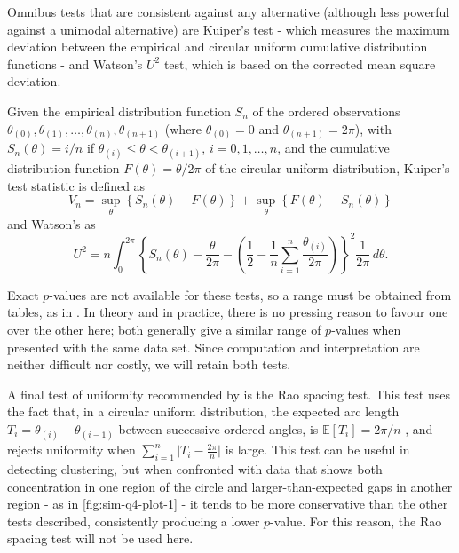 \documentclass[../../ArchStats.tex]{subfiles}
\begin{document}
Omnibus tests that are consistent against any alternative (although less powerful against a unimodal alternative) are Kuiper's test - which measures the maximum deviation between the empirical and circular uniform cumulative distribution functions - and Watson's $U^2$ test, which is based on the corrected mean square deviation. 

Given the empirical distribution function $S_n$ of the ordered observations $\theta_{(0)}, \theta_{(1)}, \dots, \theta_{(n)}, \theta_{(n+1)}$ (where $\theta_{(0)} = 0$ and $\theta_{(n+1)} = 2\pi$), with $S_n(\theta) = i/n$ if $\theta_{(i)} \leq \theta < \theta_{(i+1)}$, $i = 0,1,\dots, n$, and the cumulative distribution function $F(\theta) = \theta/2\pi$ of the circular uniform distribution, Kuiper's test statistic is defined as
\begin{equation}
V_n = \sup_\theta \left\lbrace S_n(\theta) - F(\theta) \right\rbrace + 
\sup_\theta \left\lbrace F(\theta) - S_n(\theta) \right\rbrace 
\end{equation}
and Watson's as
\begin{equation}
U^2 = n \int_0^{2\pi} \left\lbrace S_n(\theta) - \frac{\theta}{2\pi} - \left(\frac{1}{2} - \frac{1}{n} \sum_{i=1}^n \frac{\theta_{(i)}}{2\pi} \right) \right\rbrace^2 \frac{1}{2\pi}\, d\theta.
\end{equation}

Exact $p$-values are not available for these tests, so a range must be obtained from tables, as in \cite{Mardia1999}. In theory and in practice, there is no pressing reason to favour one over the other here; both generally give a similar range of $p$-values when presented with the same data set. Since computation and interpretation are neither difficult nor costly, we will retain both tests.

A final test of uniformity recommended by \cite{Pewsey2014} is the Rao spacing test. This test uses the fact that, in a circular uniform distribution, the expected arc length $T_i = \theta_{(i)} - \theta_{(i-1)}$ between successive ordered angles, is 
$\mathbb{E}\left[T_i\right] = 2\pi/n$ , and rejects uniformity when $\sum_{i=1}^n \vert T_i - \frac{2\pi}{n}\vert$ is large. This test can be useful in detecting clustering, but when confronted with data that shows both concentration in one region of the circle and larger-than-expected gaps in another region - as in \ref{fig:sim-q4-plot-1} - it tends to be more conservative than the other tests described, consistently producing a lower $p$-value. For this reason, the Rao spacing test will not be used here.
\end{document}
